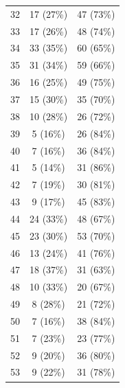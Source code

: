 \documentclass[
  letterpaper,
  DIV=11,
  numbers=noendperiod]{scrartcl}
\begin{document}
\begin{longtable}{lcc}
\hspace{1em}32 & 17 (27\%) & 47 (73\%)\\
\hspace{1em}33 & 17 (26\%) & 48 (74\%)\\
\hspace{1em}34 & 33 (35\%) & 60 (65\%)\\
\hspace{1em}35 & 31 (34\%) & 59 (66\%)\\
\hspace{1em}36 & 16 (25\%) & 49 (75\%)\\
\hspace{1em}37 & 15 (30\%) & 35 (70\%)\\
\hspace{1em}38 & 10 (28\%) & 26 (72\%)\\
\hspace{1em}39 & 5 (16\%) & 26 (84\%)\\
\hspace{1em}40 & 7 (16\%) & 36 (84\%)\\
\hspace{1em}41 & 5 (14\%) & 31 (86\%)\\
\hspace{1em}42 & 7 (19\%) & 30 (81\%)\\
\hspace{1em}43 & 9 (17\%) & 45 (83\%)\\
\hspace{1em}44 & 24 (33\%) & 48 (67\%)\\
\hspace{1em}45 & 23 (30\%) & 53 (70\%)\\
\hspace{1em}46 & 13 (24\%) & 41 (76\%)\\
\hspace{1em}47 & 18 (37\%) & 31 (63\%)\\
\hspace{1em}48 & 10 (33\%) & 20 (67\%)\\
\hspace{1em}49 & 8 (28\%) & 21 (72\%)\\
\hspace{1em}50 & 7 (16\%) & 38 (84\%)\\
\hspace{1em}51 & 7 (23\%) & 23 (77\%)\\
\hspace{1em}52 & 9 (20\%) & 36 (80\%)\\
\hspace{1em}53 & 9 (22\%) & 31 (78\%)\\

\end{longtable}
\end{document}
